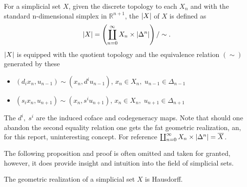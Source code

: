 \documentclass[../../main.tex]{subfiles}
\begin{document}
    \begin{definition}
        For a simplicial set $X$, given the discrete topology to each $X_n$ and with the standard n-dimensional simplex in $\mathbb{R}^{n+1}$, the  $\geom[X]$ of $X$ is defined as
        \[\geom[X]=\left(\coprod_{n=0}^{\infty} X_n \times \geom[\Delta^n]\right)/\sim.\]
        $\geom[X]$ is equipped with the quotient topology and the equivalence relation $(\sim)$ generated by these 
        \begin{itemize}
            \item $(d_ix_{n},u_{n-1})\sim(x_{n}, d^iu_{n-1})$, $x_n\in X_n,\; u_{n-1} \in \Delta _{n-1}$
            \item $(s_ix_n, u_{n+1})\sim(x_n, s^iu_{n+1})$, $x_n \in X_n,\; u_{n+1}\in \Delta_{n+1}$
        \end{itemize}
    \end{definition}
    
    The $d^i,\; s^i$ are the induced coface and codegeneracy maps. Note that should one abandon the second equality relation one gets the fat geometric realization, an, for this report, uninteresting concept. For reference $\coprod_{n=0}^{\infty} X_n \times \geom[\Delta^n]= \bigGeom X$.

    The following proposition and proof is often omitted and taken for granted, however, it does provide insight and intuition into the field of simplicial sets. 

    \begin{proposition}
        The geometric realization of a simplicial set $X$ is Hausdorff.
    \end{proposition}
\end{document}
